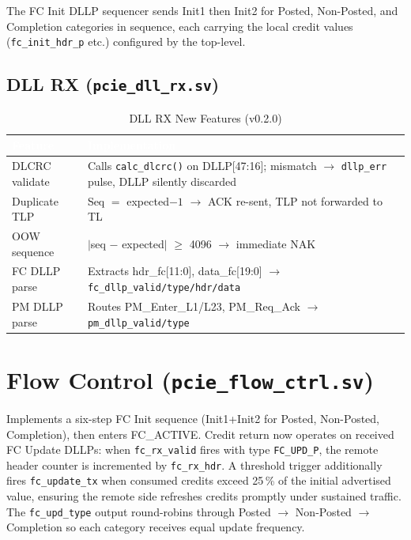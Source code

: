 \documentclass[12pt,a4paper]{report}
\newcommand{\theadcell}[1]{%
  \cellcolor{tablehead}\textcolor{white}{\textbf{#1}}}
\begin{document}
The FC Init DLLP sequencer sends Init1 then Init2 for Posted, Non-Posted,
and Completion categories in sequence, each carrying the local credit values
(\texttt{fc\_init\_hdr\_p} etc.) configured by the top-level.

\subsection{DLL RX (\texttt{pcie\_dll\_rx.sv})}

\begin{table}[H]
\centering
\caption{DLL RX New Features (v0.2.0)}
\label{tab:dllrx}
\begin{tabular}{lp{9cm}}
  \toprule
  \theadcell{Feature} & \theadcell{Implementation} \\
  \midrule
  DLCRC validate  & Calls \texttt{calc\_dlcrc()} on DLLP[47:16]; mismatch $\to$
                    \texttt{dllp\_err} pulse, DLLP silently discarded \\
  Duplicate TLP   & Seq $= $ expected$-1$ $\to$ ACK re-sent, TLP not forwarded to TL \\
  OOW sequence    & $|$seq $-$ expected$|$ $\geq$ 4096 $\to$ immediate NAK \\
  FC DLLP parse   & Extracts hdr\_fc[11:0], data\_fc[19:0] $\to$ \texttt{fc\_dllp\_valid/type/hdr/data} \\
  PM DLLP parse   & Routes PM\_Enter\_L1/L23, PM\_Req\_Ack $\to$ \texttt{pm\_dllp\_valid/type} \\
  \bottomrule
\end{tabular}
\end{table}

\section{Flow Control (\texttt{pcie\_flow\_ctrl.sv})}

Implements a six-step FC Init sequence (Init1+Init2 for Posted, Non-Posted,
Completion), then enters FC\_ACTIVE. Credit return now operates on received
FC Update DLLPs: when \texttt{fc\_rx\_valid} fires with type \texttt{FC\_UPD\_P},
the remote header counter is incremented by \texttt{fc\_rx\_hdr}.  A threshold
trigger additionally fires \texttt{fc\_update\_tx} when consumed credits exceed
25\,\% of the initial advertised value, ensuring the remote side refreshes
credits promptly under sustained traffic.  The \texttt{fc\_upd\_type} output
round-robins through Posted $\to$ Non-Posted $\to$ Completion so each category
receives equal update frequency.
\end{document}
